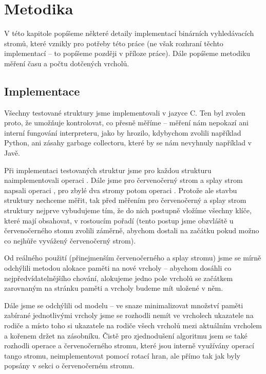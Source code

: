 \chapter{Metodika}

V této kapitole popíšeme některé detaily implementací binárních vyhledávacích stromů, které vznikly pro potřeby této práce (ne však rozhraní těchto implementací -- to popíšeme později v příloze práce). Dále popíšeme metodiku měření času a počtu dotčených vrcholů.

\section{Implementace}

Všechny testované struktury jsme implementovali v jazyce C. Ten byl zvolen
proto, že umožňuje kontrolovat, co přesně měříme -- měření nám nepokazí ani
interní fungování interpreteru, jako by hrozilo, kdybychom zvolili například
Python, ani zásahy garbage collectoru, které by se nám nevyhnuly například v
Javě.

Při implementaci testovaných struktur jsme pro každou strukturu
naimplementovali operaci . Dále jsme pro červenočerný strom a splay
strom napsali operaci , pro zbylé dva stromy potom operaci
. Protože ale stavbu struktury nechceme měřit, tak před měřením pro
červenočerný a splay strom struktury nejprve vybudujeme tím, že do nich
postupně vložíme všechny klíče, které mají obsahovat, v rostoucím pořadí (tento postup jsme obzvláště u červenočerného stomu zvolili záměrně, abychom dostali na začátku pokud možno co nejhůře vyvážený červenočerný strom). 

Od reálného použití (přinejmenším červenočerného a splay stromu) jsme se mírně odchýlili metodou alokace paměti na nové vrcholy -- abychom dosáhli co nejpředvídatelnějšího chování, alokujeme jedno pole vrcholů se začátkem zarovnaným na stránku paměti a vrcholy budeme mít uložené v něm.

Dále jsme se odchýlili od modelu -- ve snaze minimalizovat množství paměti zabírané jednotlivými vrcholy jsme se rozhodli nemít ve vrcholech ukazatele na rodiče a místo toho si ukazatele na rodiče všech vrcholů mezi aktuálním vrcholem a kořenem držet na zásobníku. Čistě pro zjednodušení algoritmu jsem se také rozhodli operace  a  červenočerného stromu, které jsou interně využívány operací  tango stromu, neimplementovat pomocí rotací hran, ale přímo tak jak byly popsány v sekci o červenočerném stromu. 

